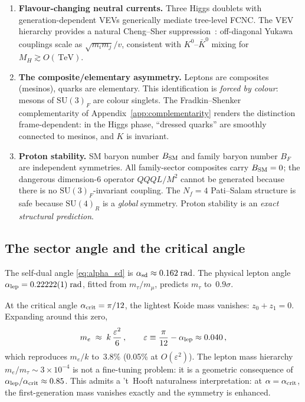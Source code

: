 \documentclass[12pt,a4paper]{article}
\newcommand{\SU}{\mathrm{SU}}
\newcommand{\Nf}{N_f}
\newcommand{\TeV}{\,\mathrm{TeV}}
\begin{document}
\begin{enumerate}
  \item \textbf{Flavour-changing neutral currents.}
    Three Higgs doublets with generation-dependent VEVs generically
    mediate tree-level FCNC. The VEV hierarchy provides a natural
    Cheng--Sher suppression~\cite{ChengSher:1987}: off-diagonal
    Yukawa couplings scale as $\sqrt{m_i m_j}/v$, consistent
    with $K^0$--$\bar K^0$ mixing for $M_H \gtrsim O(\TeV)$.

  \item \textbf{The composite/elementary asymmetry.}
    Leptons are composites (mesinos), quarks are elementary. This
    identification is \emph{forced by colour}: mesons of $\SU(3)_F$
    are colour singlets.
    The Fradkin--Shenker complementarity of
    Appendix~\ref{app:complementarity} renders the distinction
    frame-dependent: in the Higgs phase, ``dressed quarks'' are
    smoothly connected to mesinos, and $K$ is invariant.

  \item \textbf{Proton stability.}
    SM baryon number $B_{\rm SM}$ and family
    baryon number $B_F$ are independent symmetries. All family-sector
    composites carry $B_{\rm SM} = 0$; the dangerous dimension-6
    operator $QQQL/M^2$ cannot be generated because there is no
    $\SU(3)_F$-invariant coupling. The $\Nf = 4$ Pati--Salam structure
    is safe because $\SU(4)_R$ is a \emph{global} symmetry.
    Proton stability is an \emph{exact structural prediction}.
\end{enumerate}

\subsection{The sector angle and the critical angle}

The self-dual angle \eqref{eq:alpha_sd} is $\alpha_{\rm sd} \approx
0.162\;\text{rad}$.  The physical lepton angle
$\alpha_{\rm lep} = 0.22222(1)\;\text{rad}$, fitted from
$m_\tau/m_\mu$, predicts $m_\tau$ to~$0.9\sigma$.

At the critical angle $\alpha_{\rm crit} = \pi/12$, the lightest Koide
mass vanishes: $z_0 + z_1 = 0$.  Expanding around this zero,
\begin{equation}
  m_e \;\approx\; k\,\frac{\varepsilon^2}{6}\,,
  \qquad
  \varepsilon \equiv \frac{\pi}{12} - \alpha_{\rm lep}
  \approx 0.040\,,
  \label{eq:me_crit}
\end{equation}
which reproduces $m_e/k$ to~$3.8\%$ (0.05\% at $O(\varepsilon^2)$).
The lepton mass hierarchy $m_e/m_\tau \sim 3\times 10^{-4}$ is not a
fine-tuning problem: it is a geometric consequence of
$\alpha_{\rm lep}/\alpha_{\rm crit} \approx 0.85$.
This admits a 't~Hooft naturalness interpretation: at
$\alpha = \alpha_{\rm crit}$, the first-generation mass
vanishes exactly and the symmetry is enhanced.
\end{document}
